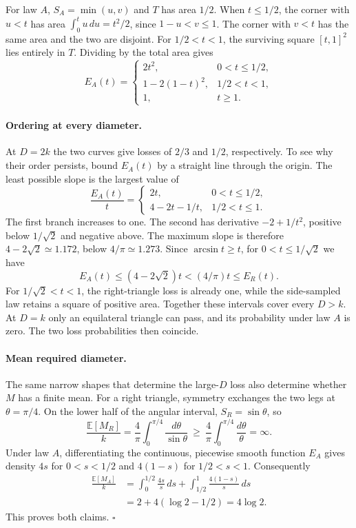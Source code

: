 \documentclass[11pt]{article}
\begin{document}
For law $A$, $S_A=\min(u,v)$ and $T$ has area $1/2$. When $t\le1/2$, the
corner with $u<t$ has area $\int_0^t u\,du=t^2/2$, since $1-u<v\le1$.
The corner with $v<t$ has the same area and the two are disjoint. For
$1/2<t<1$, the surviving square $[t,1]^2$ lies entirely in $T$. Dividing
by the total area gives
\[
 E_A(t)=
 \begin{cases}
 2t^2,&0<t\le1/2,\\
 1-2(1-t)^2,&1/2<t<1,\\
 1,&t\ge1 .
 \end{cases}
\]
\newpage
\paragraph{Ordering at every diameter.}
At $D=2k$ the two curves give losses of $2/3$ and $1/2$, respectively.
To see why their order persists, bound $E_A(t)$ by a straight line through
the origin. The least possible slope is the largest value of
\[
 \frac{E_A(t)}t=
 \begin{cases}
 2t,&0<t\le1/2,\\
 4-2t-1/t,&1/2<t\le1 .
 \end{cases}
\]
The first branch increases to one. The second has derivative $-2+1/t^2$,
positive below $1/\sqrt2$ and negative above. The maximum slope is
therefore $4-2\sqrt2\simeq1.172$, below $4/\pi\simeq1.273$.
Since $\arcsin t\ge t$, for $0<t\le1/\sqrt2$ we have
\[
 E_A(t)\le(4-2\sqrt2)t < (4/\pi)t\le E_R(t).
\]
For $1/\sqrt2<t<1$, the right-triangle loss is already one, while the
side-sampled law retains a square of positive area. Together these intervals
cover every $D>k$. At $D=k$ only an equilateral triangle can pass, and its
probability under law $A$ is zero. The two loss probabilities then coincide.

\paragraph{Mean required diameter.}
The same narrow shapes that determine the large-$D$ loss also determine
whether $M$ has a finite mean. For a right triangle, symmetry exchanges the
two legs at $\theta=\pi/4$. On the lower half of the angular interval,
$S_R=\sin\theta$, so
\[
 \frac{\mathbb E[M_R]}k
 =\frac4\pi\int_0^{\pi/4}\frac{d\theta}{\sin\theta}
 \ \ge\ \frac4\pi\int_0^{\pi/4}\frac{d\theta}{\theta}
 =\infty .
\]
Under law $A$, differentiating the continuous, piecewise smooth function
$E_A$ gives density $4s$ for $0<s<1/2$ and $4(1-s)$ for $1/2<s<1$.
Consequently
\begin{align*}
 \frac{\mathbb E[M_A]}k
 &=\int_0^{1/2}\frac{4s}{s}\,ds+
   \int_{1/2}^1\frac{4(1-s)}s\,ds\\
 &=2+4(\log 2-1/2)=4\log 2 .
\end{align*}
This proves both claims. \hfill$\square$
\end{document}
